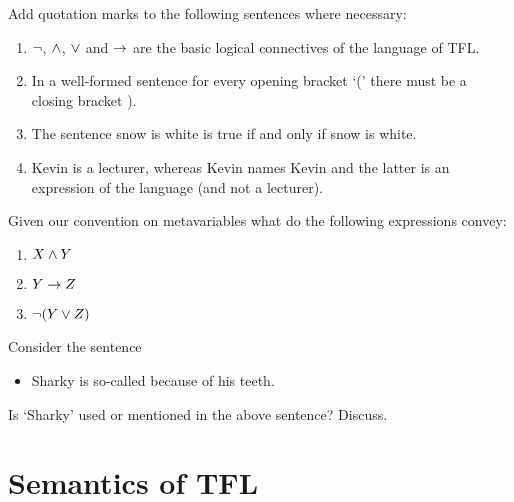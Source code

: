 \begin{practiceproblems}
\problempart
Add quotation marks to the following sentences where necessary:
\begin{enumerate}
\item {}$\neg$, $\mathbin{\wedge}$, $\vee$ and $\rightarrow$ are the basic logical connectives of the language of TFL.
\item In a well-formed sentence for every opening bracket `(' there must be a closing bracket ).
\item The sentence snow is white is true if and only if snow is white. 
\item Kevin is a lecturer, whereas Kevin names Kevin and the latter is an expression of the language (and not a lecturer).
\end{enumerate}

\problempart
Given our convention on metavariables what do the following expressions convey:
\begin{enumerate}
\item $X\mathbin{\wedge}Y$
\item $Y\rightarrow Z$
\item $\neg(Y\vee Z)$
\end{enumerate}

\problempart
Consider the sentence
\begin{itemize}
\item Sharky is so-called because of his teeth.
\end{itemize}
Is `Sharky' used or mentioned in the above sentence? Discuss.
\end{practiceproblems}


\chapter{Semantics of TFL}
